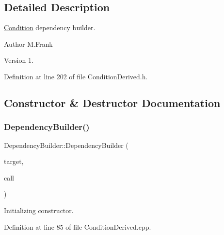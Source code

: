 \subsection{Detailed Description}
\hyperlink{class_d_d4hep_1_1_conditions_1_1_condition}{Condition} dependency builder. 

\begin{DoxyAuthor}{Author}
M.\+Frank 
\end{DoxyAuthor}
\begin{DoxyVersion}{Version}
1. 
\end{DoxyVersion}


Definition at line 202 of file Condition\+Derived.\+h.



\subsection{Constructor \& Destructor Documentation}
\hypertarget{class_d_d4hep_1_1_conditions_1_1_dependency_builder_a3587f9592bbecbbf5594e9953a67eea1}{}\label{class_d_d4hep_1_1_conditions_1_1_dependency_builder_a3587f9592bbecbbf5594e9953a67eea1} 
\subsubsection{\texorpdfstring{Dependency\+Builder()}{DependencyBuilder()}}
{\footnotesize\ttfamily Dependency\+Builder\+::\+Dependency\+Builder (\begin{DoxyParamCaption}\item[{const \hyperlink{class_d_d4hep_1_1_conditions_1_1_condition_key}{Condition\+Key} \&}]{target,  }\item[{\hyperlink{class_d_d4hep_1_1_conditions_1_1_condition_update_call}{Condition\+Update\+Call} $\ast$}]{call }\end{DoxyParamCaption})}



Initializing constructor. 



Definition at line 85 of file Condition\+Derived.\+cpp.

\hypertarget{class_d_d4hep_1_1_conditions_1_1_dependency_builder_a133550ebf6fef71c365258c1034a4957}{}\label{class_d_d4hep_1_1_conditions_1_1_dependency_builder_a133550ebf6fef71c365258c1034a4957} 
